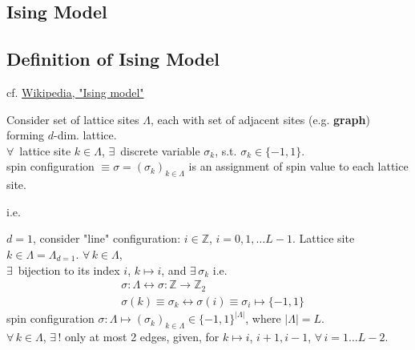 \documentclass[10pt]{amsart}
\begin{document}
\begin{multicols*}{2}
\section{Ising Model}  

\subsection{Definition of Ising Model}  

cf. \href{https://en.wikipedia.org/wiki/Ising_model}{Wikipedia, "Ising model"}

Consider set of lattice sites $\Lambda$, each with set of adjacent sites (e.g. \textbf{graph}) forming $d$-dim. lattice.  \\
$\forall \, $ lattice site $k\in \Lambda$, $\exists \, $ discrete variable $\sigma_k$, s.t. $\sigma_k \in \lbrace -1, 1\rbrace$.  \\
spin configuration $\equiv \sigma = (\sigma_k)_{k\in \Lambda}$ is an assignment of spin value to each lattice site.  

i.e. 

$d=1$, consider "line" configuration: $i \in \mathbb{Z}$, $i=0,1,\dots L-1$.  Lattice site $k \in \Lambda = \Lambda_{d=1}$.  $\forall \, k \in \Lambda$, \\ 
$\exists \, $ bijection to its index $i$, $k\mapsto i$, and $\exists \, \sigma_k$ i.e. 
\[
\begin{aligned}
	& \sigma : \Lambda \leftrightarrow \sigma: \mathbb{Z} \to \mathbb{Z}_2 \\ 
	& \sigma(k) \equiv \sigma_k \leftrightarrow \sigma(i) \equiv \sigma_i \mapsto \lbrace -1, 1 \rbrace
\end{aligned}
\]
spin configuration $\sigma : \Lambda \mapsto (\sigma_k)_{k\in \Lambda} \in \lbrace -1,1 \rbrace^{| \Lambda |}$, where $|\Lambda | =L$.  \\
$\forall \, k \in \Lambda$, $\exists \, ! $ only at most 2 edges, given, for $k\mapsto i$, $i+1,i-1$, $\forall \, i = 1 \dots L-2$.  


\end{multicols*}
\end{document}
